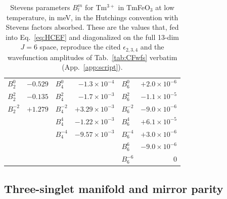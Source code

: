 \documentclass[reprint,amsmath,amssymb,aps,prb,longbibliography]{revtex4-2}
\newcommand{\fix}[1]{#1}
\begin{document}
\begin{table}[t]
\caption{Stevens parameters $B_l^m$ for Tm$^{3+}$ in TmFeO$_3$ at low
temperature, in meV, in the Hutchings convention with Stevens factors
absorbed. \fix{These are the values that, fed into
Eq.~\eqref{eq:HCEF} and diagonalized on the full 13-dim $J=6$ space,
reproduce the cited $\epsilon_{2,3,4}$ and the wavefunction amplitudes
of Tab.~\ref{tab:CFwfs} verbatim (App.~\ref{app:script}).}}
\label{tab:Stevens}
\begin{ruledtabular}
\begin{tabular}{lr|lr|lr}
$B_2^0$  & $-0.529$ & $B_4^0$  & $-1.3\times 10^{-4}$ & $B_6^0$  & $+2.0\times 10^{-6}$ \\
$B_2^2$  & $-0.135$ & $B_4^2$  & $-1.7\times 10^{-3}$ & $B_6^2$  & $-1.1\times 10^{-5}$ \\
$B_2^{-2}$ & $+1.279$ & $B_4^{-2}$ & $+3.29\times 10^{-3}$ & $B_6^{-2}$ & $-9.0\times 10^{-6}$ \\
         &        & $B_4^4$  & $-1.22\times 10^{-3}$ & $B_6^4$  & $+6.1\times 10^{-5}$ \\
         &        & $B_4^{-4}$ & $-9.57\times 10^{-3}$ & $B_6^{-4}$ & $+3.0\times 10^{-6}$ \\
         &        &          &           & $B_6^6$  & $-9.0\times 10^{-6}$ \\
         &        &          &           & $B_6^{-6}$ & $0$ \\
\end{tabular}
\end{ruledtabular}
\end{table}

\subsection{Three-singlet manifold and mirror parity}
\label{sec:mJparity}
\end{document}
